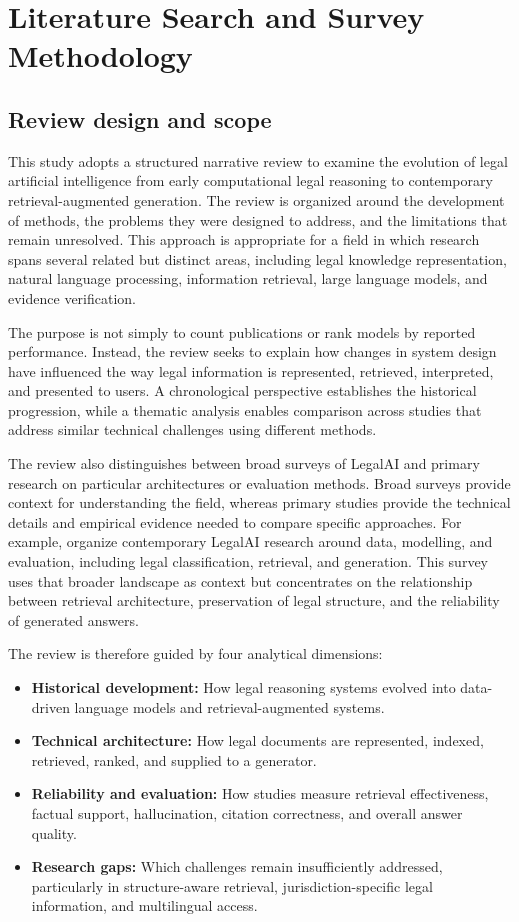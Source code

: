 \section{Literature Search and Survey Methodology}
\label{sec:method}

\subsection{Review design and scope}

This study adopts a structured narrative review to examine the evolution of legal artificial
intelligence from early computational legal reasoning to contemporary retrieval-augmented
generation. The review is organized around the development of methods, the problems they were
designed to address, and the limitations that remain unresolved. This approach is appropriate for
a field in which research spans several related but distinct areas, including legal knowledge
representation, natural language processing, information retrieval, large language models, and
evidence verification.

The purpose is not simply to count publications or rank models by reported performance. Instead,
the review seeks to explain how changes in system design have influenced the way legal information
is represented, retrieved, interpreted, and presented to users. A chronological perspective
establishes the historical progression, while a thematic analysis enables comparison across
studies that address similar technical challenges using different methods.

The review also distinguishes between broad surveys of LegalAI and primary research on particular
architectures or evaluation methods. Broad surveys provide context for understanding the field,
whereas primary studies provide the technical details and empirical evidence needed to compare
specific approaches. For example, \citet{chi2026} organize contemporary LegalAI research around
data, modelling, and evaluation, including legal classification, retrieval, and generation. This
survey uses that broader landscape as context but concentrates on the relationship between
retrieval architecture, preservation of legal structure, and the reliability of generated answers.

The review is therefore guided by four analytical dimensions:
\begin{itemize}[leftmargin=1.4em, itemsep=2pt, topsep=2pt]
\item \textbf{Historical development:} How legal reasoning systems evolved into data-driven
language models and retrieval-augmented systems.
\item \textbf{Technical architecture:} How legal documents are represented, indexed, retrieved,
ranked, and supplied to a generator.
\item \textbf{Reliability and evaluation:} How studies measure retrieval effectiveness, factual
support, hallucination, citation correctness, and overall answer quality.
\item \textbf{Research gaps:} Which challenges remain insufficiently addressed, particularly in
structure-aware retrieval, jurisdiction-specific legal information, and multilingual access.
\end{itemize}

